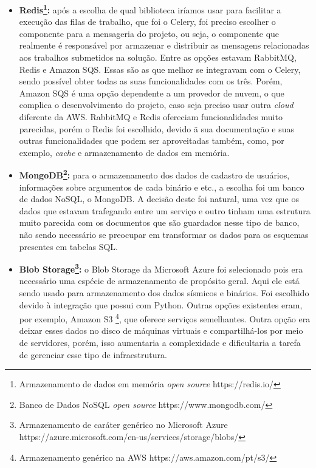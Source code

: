 \documentclass[11pt,twoside]{article}
\begin{document}
\begin{itemize}
  \item \textbf{Redis\footnote{Armazenamento de dados em memória \emph{open source} https://redis.io/}:} após a escolha de qual biblioteca iríamos usar para facilitar a execução das filas de trabalho, que foi o Celery, foi preciso escolher o componente para a mensageria do projeto, ou seja, o
  componente que realmente é responsável por armazenar e distribuir as mensagens relacionadas aos trabalhos submetidos na solução. Entre as opções estavam RabbitMQ, Redis e Amazon SQS. Essas são as que melhor se 
  integravam com o Celery, sendo possível obter todas as suas funcionalidades com os três. Porém, Amazon SQS é uma opção dependente a um provedor de nuvem, o que complica o desenvolvimento do projeto, caso seja 
  preciso usar outra \emph{cloud} diferente da AWS. RabbitMQ e Redis ofereciam funcionalidades muito parecidas, porém o Redis foi escolhido, devido ã sua documentação e suas outras funcionalidades
  que podem ser aproveitadas também, como, por exemplo, \emph{cache} e armazenamento de dados em memória.

  \item \textbf{MongoDB\footnote{Banco de Dados NoSQL \emph{open source} https://www.mongodb.com/}:} para o armazenamento dos dados de cadastro de usuários, informações sobre argumentos de cada binário e etc., a escolha foi um banco de dados NoSQL, o MongoDB. A decisão deste
  foi natural, uma vez que os dados que estavam trafegando entre um serviço e outro tinham uma estrutura muito parecida com os documentos que são guardados nesse tipo de banco, não sendo necessário se preocupar
  em transformar os dados para os esquemas presentes em tabelas SQL.

  \item \textbf{Blob Storage\footnote{Armazenamento de caráter genérico no Microsoft Azure https://azure.microsoft.com/en-us/services/storage/blobs/}:} o Blob Storage da Microsoft Azure foi selecionado pois era necessário uma espécie de armazenamento de propósito geral. Aqui ele está sendo usado para armazenamento dos dados sísmicos e
  binários. Foi escolhido devido à integração que possui com Python. Outras opções existentes eram, por exemplo, Amazon S3 \footnote{Armazenamento genérico na AWS https://aws.amazon.com/pt/s3/}, que oferece serviços semelhantes. Outra opção era deixar esses dados 
  no disco de máquinas virtuais e compartilhá-los por meio de servidores, porém, isso aumentaria a complexidade e dificultaria a tarefa de gerenciar esse tipo de infraestrutura.
\end{itemize}
\end{document}

